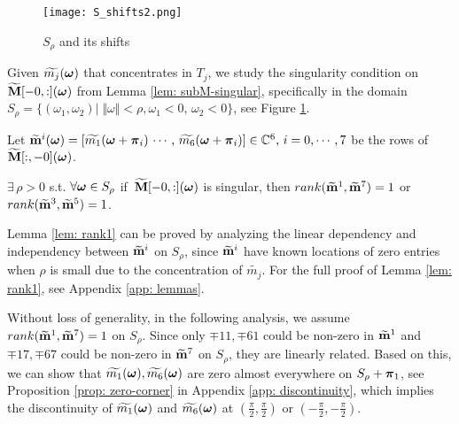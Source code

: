 \begin{figure}
\centering
\texttt{[image: S\_shifts2.png]}
\caption{$S_{\rho}$ and its shifts}
\label{fig: S-shifts}
\end{figure}
Given $\widetilde{m_{j}}(\boldsymbol{\omega})$ that concentrates in $T_j$, we study the singularity condition on $\widetilde{\mathbf{M}}[-0,:](\boldsymbol{\omega})$ from Lemma \ref{lem: subM-singular}, specifically in the domain $S_{\rho} = \{(\omega_1,\omega_2)|\;\Vert\omega\Vert < \rho, \omega_1 <0,\,\omega_2<0\}$, see Figure \ref{fig: S-shifts}. 

Let $\widetilde{\mathbf{m}}^{i}(\boldsymbol{\omega}) = [\widetilde{m_1}(\boldsymbol{\omega}+\boldsymbol{\pi}_i)\, \cdots,\,\widetilde{m_6}(\boldsymbol{\omega}+\boldsymbol{\pi}_i)]\in\mathbb{C}^6,\, i = 0,\cdots,7$ be the rows of $\widetilde{\mathbf{M}}[:,-0](\boldsymbol{\omega})$. 
\begin{lemma}\label{lem: rank1}
$\exists\, \rho>0$ s.t. $\forall \boldsymbol{\omega}\in S_\rho$ if $\,\widetilde{\mathbf{M}}[-0,:](\boldsymbol{\omega})$ is singular, then $rank(\widetilde{\mathbf{m}}^{1},\widetilde{\mathbf{m}}^{7})=1$ or $rank(\widetilde{\mathbf{m}}^{3},\widetilde{\mathbf{m}}^{5}) = 1$.
\end{lemma}
Lemma \ref{lem: rank1} can be proved by analyzing the linear dependency and independency between $\widetilde{\mathbf{m}}^{i}$ on $S_\rho$, since $\widetilde{\mathbf{m}}^{i}$ have known locations of zero entries when $\rho$ is small due to the concentration of $\widetilde{m_j}$.
For the full proof of Lemma \ref{lem: rank1}, see Appendix \ref{app: lemmas}.

Without loss of generality, in the following analysis, we assume $rank(\widetilde{\mathbf{m}}^{1},\widetilde{\mathbf{m}}^{7}) = 1$ on $S_\rho$.
Since only $\mp{1}{1}, \mp{6}{1}$ could be non-zero in $\widetilde{\mathbf{m}}^{1}$ and $\mp{1}{7}, \mp{6}{7}$ could be non-zero in $\widetilde{\mathbf{m}}^{7}$ on $S_\rho$, they are linearly related. Based on this, we can show that $\widetilde{m_{1}}(\boldsymbol{\omega}),\widetilde{m_{6}}(\boldsymbol{\omega})$ are zero almost everywhere on $S_\rho + \boldsymbol{\pi}_1$, see Proposition \ref{prop: zero-corner} in Appendix \ref{app: discontinuity}, which implies the discontinuity of $\widetilde{m_{1}}(\boldsymbol{\omega})$ and $\widetilde{m_{6}}(\boldsymbol{\omega})$ at $(\frac{\pi}{2},\frac{\pi}{2})$ or $(-\frac{\pi}{2},-\frac{\pi}{2})$.

